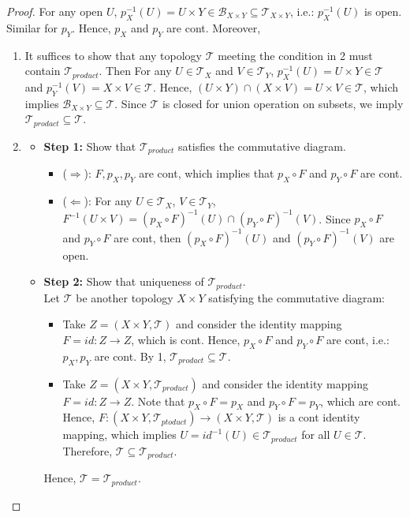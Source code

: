 \begin{proof}
    For any open $U$, $p_X^{-1}(U) = U\times Y \in \mathcal{B}_{X\times Y} \subseteq \mathcal{T}_{X\times Y}$, i.e.: $p_X^{-1}(U)$ is open. Similar for $p_Y$. Hence, $p_X$ and $p_Y$ are cont.
    Moreover,
    \begin{enumerate}
        \item It suffices to show that any topology $\mathcal{T}$ meeting the condition in 2 must contain $\mathcal{T}_{product}$. Then For any $U \in \mathcal{T}_X$ and $V\in \mathcal{T}_Y$, $p_X^{-1} (U) = U\times Y \in \mathcal{T}$ and $p_Y^{-1}(V) = X\times V \in \mathcal{T}$. Hence, $(U\times Y) \cap (X\times V) =U\times V \in \mathcal{T}$, which implies $\mathcal{B}_{X\times Y} \subseteq \mathcal{T}$.
        Since $\mathcal{T}$ is closed for union operation on subsets, we imply $\mathcal{T}_{prodact}\subseteq \mathcal{T}$.
        \item \begin{itemize}
            \item \textbf{Step 1:} Show that $\mathcal{T}_{product}$ satisfies the commutative diagram.
            \begin{itemize}
                \item ($\Rightarrow$): $F,p_X,p_Y$ are cont, which implies that $p_X\circ F$ and $p_Y \circ F$ are cont.
                \item ($\Leftarrow$): For any $U\in \mathcal{T}_X$, $V\in \mathcal{T}_Y$, $F^{-1}(U\times V)= (p_X\circ F)^{-1}(U) \cap (p_Y\circ F)^{-1}(V)$. Since $p_X\circ F$ and $p_Y \circ F$ are cont, then $(p_X\circ F)^{-1}(U) $ and $ (p_Y\circ F)^{-1}(V)$ are open.
            \end{itemize}
            \item \textbf{Step 2:} Show that uniqueness of $\mathcal{T}_{product}$.\\
            Let $\mathcal{T}$ be another topology $X\times Y$ satisfying the commutative diagram:
            \begin{itemize}
                \item Take $Z = (X\times Y,\mathcal{T})$ and consider the identity mapping $F=id: Z\rightarrow Z$, which is cont. Hence, $p_X\circ F$ and $p_Y \circ F$ are cont, i.e.: $p_X,p_Y$ are cont. By 1, $\mathcal{T}_{prodact}\subseteq \mathcal{T}$.
                \item Take $Z = (X\times Y, \mathcal{T}_{product})$ and consider the identity mapping $F = id: Z \rightarrow Z$. Note that $p_X\circ F=p_X$ and $p_Y\circ F=p_Y$, which are cont. Hence, $F: (X\times Y, \mathcal{T}_{ptoduct}) \rightarrow (X\times Y, \mathcal{T})$ is a cont identity mapping, which implies $U= id^{-1} (U) \in \mathcal{T}_{product}$ for all $U \in \mathcal{T}$. Therefore, $\mathcal{T} \subseteq \mathcal{T}_{product}$.
            \end{itemize}
            Hence, $\mathcal{T} = \mathcal{T}_{product}$.
        \end{itemize}
    \end{enumerate}
\end{proof}

